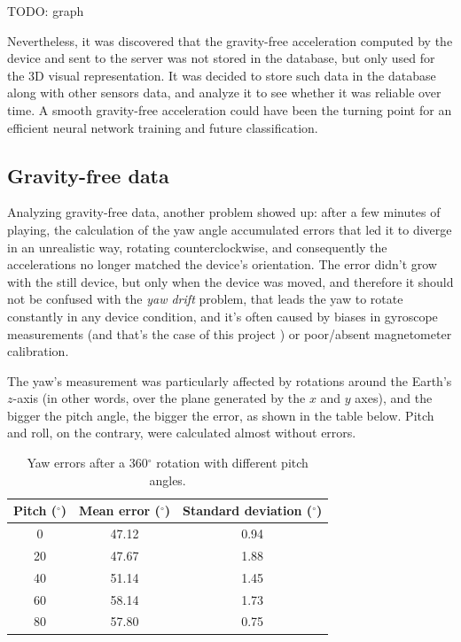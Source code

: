 TODO: graph
\bigbreak

Nevertheless, it was discovered that the gravity-free acceleration computed by the device and sent to the server was not stored in the database, but only used for the 3D visual representation. It was decided to store such data in the database along with other sensors data, and analyze it to see whether it was reliable over time. A smooth gravity-free acceleration could have been the turning point for an efficient neural network training and future classification.
\bigbreak

\subsection{Gravity-free data}
Analyzing gravity-free data, another problem showed up: after a few minutes of playing, the calculation of the yaw angle accumulated errors that led it to diverge in an unrealistic way, rotating counterclockwise, and consequently the accelerations no longer matched the device's orientation. The error didn't grow with the still device, but only when the device was moved, and therefore it should not be confused with the \textit{yaw drift} problem, that leads the yaw to rotate constantly in any device condition, and it's often caused by biases in gyroscope measurements (and that's the case of this project \cite{Pio19}) or poor/absent magnetometer calibration.
\bigbreak

The yaw's measurement was particularly affected by rotations around the Earth's $z$-axis (in other words, over the plane generated by the $x$ and $y$ axes), and the bigger the pitch angle, the bigger the error, as shown in the table below. Pitch and roll, on the contrary, were calculated almost without errors.
\bigbreak

\begin{table}[ht]
	\centering
	\begin{tabular}{c|c c}
	\textbf{Pitch} ($^{\circ}$) & \textbf{Mean error} ($^{\circ}$) & \textbf{Standard deviation} ($^{\circ}$) \\ \hline
	0                           & 47.12                            & 0.94                                     \\
	20                          & 47.67                            & 1.88                                     \\
	40                          & 51.14                            & 1.45                                     \\
	60                          & 58.14                            & 1.73                                     \\
	80                          & 57.80                            & 0.75
	\end{tabular}
	\caption{Yaw errors after a 360$^{\circ}$ rotation with different pitch angles.}
\end{table}

